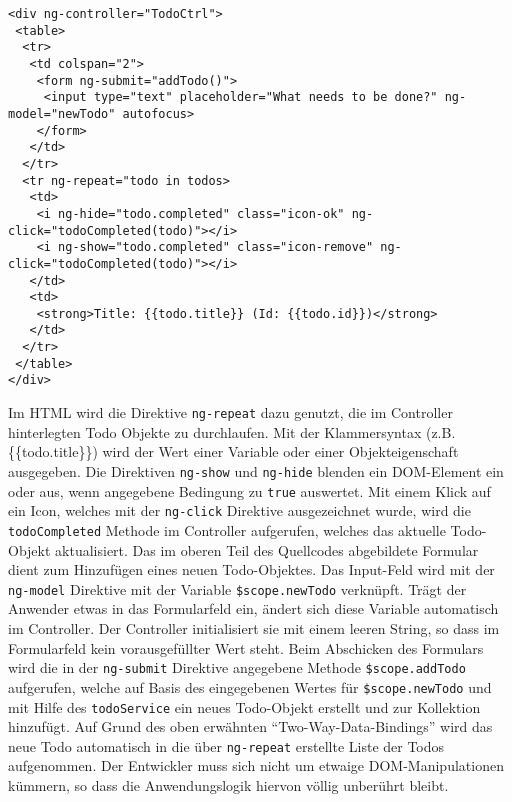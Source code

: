\begin{lstlisting}
<div ng-controller="TodoCtrl">
 <table>
  <tr>
   <td colspan="2">
    <form ng-submit="addTodo()">
     <input type="text" placeholder="What needs to be done?" ng-model="newTodo" autofocus>
    </form>
   </td>
  </tr>
  <tr ng-repeat="todo in todos>
   <td>
    <i ng-hide="todo.completed" class="icon-ok" ng-click="todoCompleted(todo)"></i>
    <i ng-show="todo.completed" class="icon-remove" ng-click="todoCompleted(todo)"></i>
   </td>
   <td>
    <strong>Title: {{todo.title}} (Id: {{todo.id}})</strong>
   </td>
  </tr>
 </table>
</div>
\end{lstlisting}
Im HTML wird die Direktive \texttt{ng-repeat} dazu genutzt, die im Controller hinterlegten Todo Objekte zu durchlaufen. Mit der Klammersyntax (z.B. \{\{todo.title\}\}) wird der Wert einer Variable oder einer Objekteigenschaft ausgegeben. Die Direktiven \texttt{ng-show} und \texttt{ng-hide} blenden ein DOM-Element ein oder aus, wenn angegebene Bedingung zu \texttt{true} auswertet. Mit einem Klick auf ein Icon, welches mit der \texttt{ng-click} Direktive ausgezeichnet wurde, wird die \texttt{todoCompleted} Methode im Controller aufgerufen, welches das aktuelle Todo-Objekt aktualisiert. Das im oberen Teil des Quellcodes abgebildete Formular dient zum Hinzufügen eines neuen Todo-Objektes. Das Input-Feld wird mit der \texttt{ng-model} Direktive mit der Variable \texttt{\$scope.newTodo} verknüpft. Trägt der Anwender etwas in das Formularfeld ein, ändert sich diese Variable automatisch im Controller. Der Controller initialisiert sie mit einem leeren String, so dass im Formularfeld kein vorausgefüllter Wert steht. Beim Abschicken des Formulars wird die in der \texttt{ng-submit} Direktive angegebene Methode \texttt{\$scope.addTodo} aufgerufen, welche auf Basis des eingegebenen Wertes für \texttt{\$scope.newTodo} und mit Hilfe des \texttt{todoService} ein neues Todo-Objekt erstellt und zur Kollektion hinzufügt. Auf Grund des oben erwähnten "`Two-Way-Data-Bindings"' wird das neue Todo automatisch in die über \texttt{ng-repeat} erstellte Liste der Todos aufgenommen. Der Entwickler muss sich nicht um etwaige DOM-Manipulationen kümmern, so dass die Anwendungslogik hiervon völlig unberührt bleibt.


